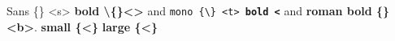 \documentclass{article}
\begin{document}
\textsf{Sans \{\textbar\} \textless s\textgreater{} \textbf{bold \textbackslash\{\}\textless\textgreater}} and \texttt{mono \{\textbackslash\} \textless t\textgreater{} \textbf{bold \textbar\textless}}
and \textbf{roman bold \{\textbar\} \textless b\textgreater}. {\small\sffamily\bfseries small \{\textless\}} {\large\ttfamily\bfseries large \{\textless\}}
\end{document}
